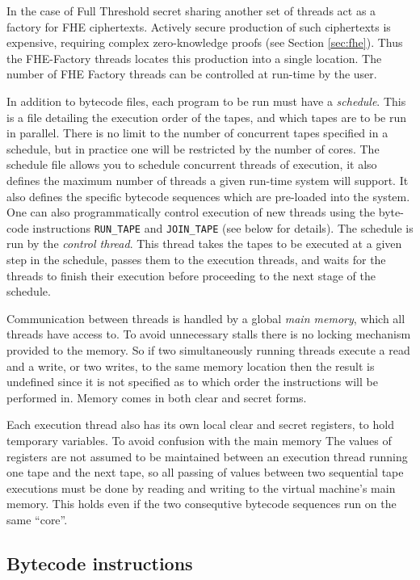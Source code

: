In the case of Full Threshold secret sharing another set of
threads act as a factory for FHE ciphertexts. Actively secure
production of such ciphertexts is expensive, requiring complex
zero-knowledge proofs (see Section \ref{sec:fhe}). Thus
the FHE-Factory threads locates this production into a
single location. The number of FHE Factory threads can be
controlled at run-time by the user.

In addition to bytecode files, each program to be run must
have a \emph{schedule}. This is a file detailing the execution
order of the tapes, and which tapes are to be run in parallel.
There is no limit to the number of concurrent tapes specified in a schedule, 
but in practice one will be restricted by the number of cores.
The schedule file allows you to schedule concurrent threads
of execution, it also defines the maximum number of threads
a given run-time system will support. It also defines
the specific bytecode sequences which are pre-loaded
into the system.
One can also programmatically control execution of new
threads using the byte-code instructions \verb+RUN_TAPE+ and \verb+JOIN_TAPE+
(see below for details).
The schedule is run by the \emph{control thread}.
This thread takes the tapes to be executed at a
given step in the schedule, passes them to the execution
threads, and waits for the threads to
finish their execution before proceeding to the next stage of
the schedule.


Communication between threads is handled by a global
\emph{main memory}, which all threads have access to.
To avoid unnecessary stalls there is no locking mechanism provided to
the memory. So if two simultaneously running threads
execute a read and a write, or two writes, to the same
memory location then the result is undefined since it is
not specified as to which order the instructions
will be performed in.
Memory comes in both clear and secret forms.


Each execution thread also has its own local clear and secret
registers, to hold temporary variables.
To avoid confusion with the main memory
The values of registers are not assumed to be maintained
between an execution thread running one tape and
the next tape, so all passing of values
between two sequential tape executions must be done
by reading and writing to the virtual machine's main memory.
This holds even if the two consequtive bytecode
sequences run  on the same ``core''.

\subsection{Bytecode instructions}

